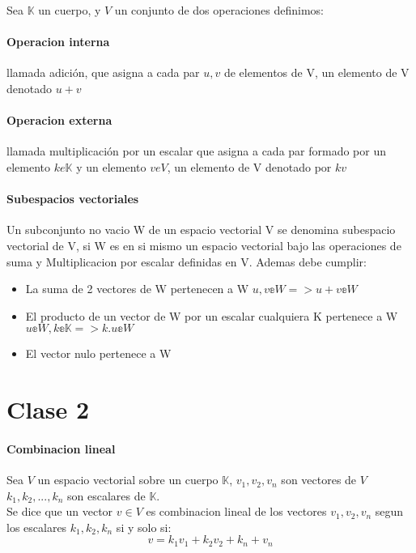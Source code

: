 \documentclass[10pt]{article}
\begin{document}
Sea $\mathbb{K}$ un cuerpo, y $V$ un conjunto de dos operaciones definimos:

\paragraph{Operacion interna}llamada adición, que asigna a cada par 
$u,v$ de elementos de V, un elemento de V denotado $u+v$

\paragraph{Operacion externa}llamada multiplicación por un escalar que 
asigna a cada par formado por un elemento $ke\mathbb{K}$ y un elemento $veV$, un elemento de V denotado por $kv$

\paragraph{Subespacios vectoriales}

Un subconjunto no vacio W de un espacio vectorial V se denomina subespacio vectorial
de V, si W es en si mismo un espacio vectorial bajo las operaciones de suma y Multiplicacion
por escalar definidas en V. Ademas debe cumplir:

\begin{itemize}
    \item La suma de 2 vectores de W pertenecen a W
    $u,v \mathbb{e} W => u + v \mathbb{e} W$
    \item El producto de un vector de W por un escalar cualquiera K pertenece a W
    $u \mathbb{e} W, k \mathbb{e} \mathbb{K} => k.u  \mathbb{e} W$
    \item El vector nulo pertenece a W 
\end{itemize}

\section{Clase 2}

\paragraph{Combinacion lineal}

Sea $V$ un espacio vectorial  sobre un cuerpo $\mathbb{K}$, $v_1, v_2, v_n$ son vectores de $V$
$k_1, k_2,..., k_n$ son escalares de $\mathbb{K}$.\\
\linebreak
Se dice que un vector $v \in V$ es combinacion lineal de los vectores $v_1, v_2, v_n$ segun los escalares $k_1, k_2, k_n$ si y solo si: 
\begin{equation*}
	v = k_1 v_1+ k_2 v_2+k_n+v_n 
\end{equation*}
\end{document}
